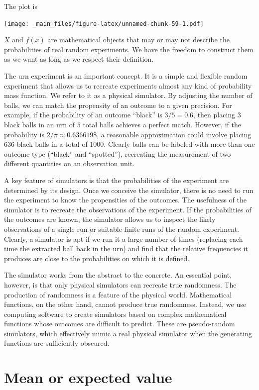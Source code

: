 \documentclass[
]{book}
\begin{document}
The plot is

\texttt{[image: \_main\_files/figure-latex/unnamed-chunk-59-1.pdf]}

\(X\) and \(f(x)\) are mathematical objects that may or may not describe the probabilities of real random experiments. We have the freedom to construct them as we want as long as we respect their definition.

The urn experiment is an important concept. It is a simple and flexible random experiment that allows us to recreate experiments almost any kind of probability mass function. We refer to it as a physical simulator. By adjusting the number of balls, we can match the propensity of an outcome to a given precision. For example, if the probability of an outcome ``black'' is \(3/5 = 0.6\), then placing \(3\) black balls in an urn of \(5\) total balls achieves a perfect match. However, if the probability is \(2/\pi \approx 0.6366198\), a reasonable approximation could involve placing \(636\) black balls in a total of \(1000\). Clearly balls can be labeled with more than one outcome type (``black'' and ``spotted''), recreating the measurement of two different quantities on an observation unit.

A key feature of simulators is that the probabilities of the experiment are determined by its design. Once we conceive the simulator, there is no need to run the experiment to know the propensities of the outcomes. The usefulness of the simulator is to recreate the observations of the experiment. If the probabilities of the outcomes are known, the simulator allows us to inspect the likely observations of a single run or suitable finite runs of the random experiment. Clearly, a simulator is apt if we run it a large number of times (replacing each time the extracted ball back in the urn) and find that the relative frequencies it produces are close to the probabilities on which it is defined.

The simulator works from the abstract to the concrete. An essential point, however, is that only physical simulators can recreate true randomness. The production of randomness is a feature of the physical world. Mathematical functions, on the other hand, cannot produce true randomness. Instead, we use computing software to create simulators based on complex mathematical functions whose outcomes are difficult to predict. These are pseudo-random simulators, which effectively mimic a real physical simulator when the generating functions are sufficiently obscured.

\hypertarget{mean-or-expected-value}{%
\section{Mean or expected value}\label{mean-or-expected-value}}
\end{document}

